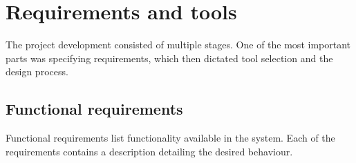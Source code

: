 \chapter{Requirements and tools}

The project development consisted of multiple stages. One of the most important parts was specifying requirements, which then dictated tool selection and the design process.

\section{Functional requirements}

Functional requirements list functionality available in the system. Each of the requirements contains a description detailing the desired behaviour.

